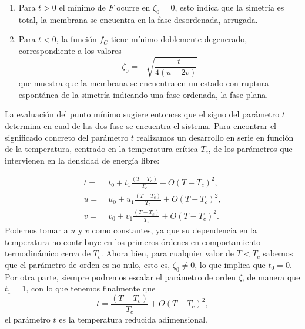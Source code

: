\begin{enumerate}
\item Para $t>0$ el mínimo de $F$ ocurre en $\zeta_0=0$, esto indica que la
  simetría es total, la membrana se encuentra en la fase desordenada,
  arrugada.
\item Para $t<0$, la función $f_C$ tiene mínimo doblemente
  degenerado, correspondiente a los valores
  \begin{equation}\label{zeta_0}
    \zeta_0=\mp \sqrt{\frac{-t}{4(u+2v)}}
  \end{equation}
  que muestra que la membrana se encuentra en un estado con ruptura espontánea
  de la simetría indicando una fase ordenada, la fase plana. 
\end{enumerate}

La evaluación del punto mínimo sugiere entonces que el
signo del parámetro $t$ determina en cual de las dos fase se encuentra el
sistema. Para encontrar el significado concreto del parámetro $t$
realizamos un desarrollo en serie en función de la temperatura, centrado en la
temperatura crítica $T_c$, de los parámetros que intervienen en la densidad
de energía libre:

\begin{align*}
t=&\; t_0+t_1\frac{(T-T_c)}{T_c}+O(T-T_c)^2,\\
u=&\; u_0+u_1\frac{(T-T_c)}{T_c}+O(T-T_c)^2,\\
v=&\; v_0+v_1\frac{(T-T_c)}{T_c}+O(T-T_c)^2.
\end{align*}
Podemos tomar a $u$ y $v$ como constantes, ya que su dependencia en la 
temperatura no contribuye en los primeros órdenes en comportamiento
termodinámico cerca de $T_c$. Ahora bien,
para cualquier valor de $T\!<\!T_c$ sabemos que el parámetro de orden es no
nulo, esto es, $\zeta_0\!\neq\! 0$, lo que implica que $t_0=0$. Por otra
parte, siempre podremos escalar el parámetro de orden 
$\zeta$, de manera que $t_1=1$, con lo que tenemos finalmente que
\begin{equation*}
t=\frac{(T-T_c)}{T_c}+O(T-T_c)^2,
\end{equation*}
el parámetro $t$ es la temperatura reducida adimensional.



